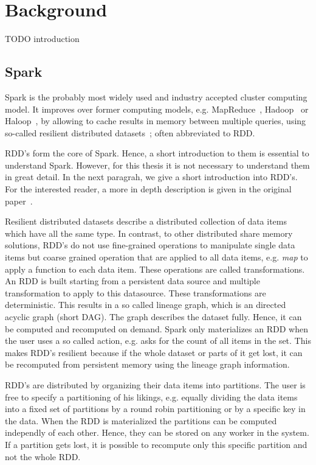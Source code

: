 \section{Background}\label{sec:background}

TODO introduction
\subsection{Spark}
Spark is the probably most widely used and industry accepted cluster computing model.
It improves over former computing models, e.g. MapReduce~\cite{mapreduce}, Hadoop~\cite{Hadoop} or Haloop~\cite{haloop},
by allowing to cache results in memory between multiple queries, using so-called resilient
distributed datasets~\cite{rdd}; often abbreviated to RDD. %

RDD's form the core of Spark.
Hence, a short introduction to them is essential to understand Spark.
However, for this thesis it is not necessary to understand them in great detail.
In the next paragrah, we give a short introduction into RDD's.
For the interested reader, a more in depth description is given in the original paper~\cite{RDDs}.

Resilient distributed datasets describe a distributed collection of data items which have
all the same type.
In contrast, to other distributed share memory solutions, RDD's do not use fine-grained
operations to manipulate single data items but coarse grained operation that are applied
to all data items, e.g. \textit{map} to apply a function to each data item.
These operations are called transformations.
An RDD is built starting from a persistent data source and multiple transformation to
apply to this datasource.
These transformations are deterministic.
This results in a so called lineage graph, which is an directed acyclic graph (short DAG).
The graph describes the dataset fully.
Hence, it can be computed and recomputed on demand.
Spark only materializes an RDD when the user uses a so called action, e.g. asks for the
count of all items in the set.
This makes RDD's resilient because if the whole dataset or parts of it get lost, it
can be recomputed from persistent memory using the lineage graph information.

RDD's are distributed by organizing their data items into partitions.
The user is free to specify a partitioning of his likings, e.g. equally dividing the data items
into a fixed set of partitions by a round robin partitioning or by a specific key in the data.
When the RDD is materialized the partitions can be computed independly of each other.
Hence, they can be stored on any worker in the system.
If a partition gets lost, it is possible to recompute only this specific partition and not
the whole RDD.

